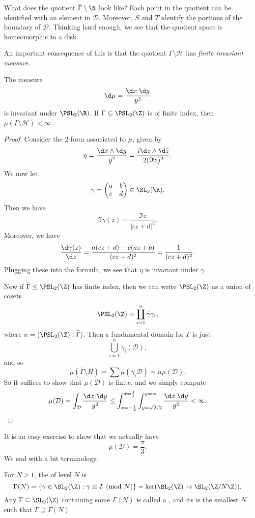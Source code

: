 \documentclass[a4paper]{article}
\renewcommand{\H}{\mathcal{H}}
\begin{document}
What does the quotient $\bar{\Gamma}\setminus \N$ look like? Each point in the quotient can be identified with an element in $\mathcal{D}$. Moreover, $S$ and $T$ identify the portions of the boundary of $\mathcal{D}$. Thinking hard enough, we see that the quotient space is homeomorphic to a disk.

An important consequence of this is that the quotient $\Gamma \setminus \H$ has \emph{finite invariant measure}.
\begin{prop}
  The measure
  \[
    \d \mu = \frac{\d x\;\d y}{y^2}
  \]
  is invariant under $\PSL_2(\R)$. If $\Gamma \subseteq \PSL_2(\Z)$ is of finite index, then $\mu(\Gamma\setminus \H) < \infty$.
\end{prop}

\begin{proof}
  Consider the $2$-form associated to $\mu$, given by
  \[
    \eta = \frac{\d x \wedge \d y}{y^2} = \frac{i \d z \wedge \d \bar{z}}{2 (\Im z)^2}.
  \]
  We now let
  \[
    \gamma =
    \begin{pmatrix}
      a & b\\
      c & d
    \end{pmatrix} \in \SL_2(\R).
  \]
  Then we have
  \[
    \Im \gamma(z) = \frac{\Im z}{|cz + d|^2}.
  \]
  Moreover, we have
  \[
    \frac{\d \gamma(z)}{\d z} = \frac{a(cz + d) - c(az + b)}{(cz + d)^2} = \frac{1}{(cz + d)^2}.
  \]
  Plugging these into the formula, we see that $\eta$ is invariant under $\gamma$.

  Now if $\bar\Gamma \leq \PSL_2(\Z)$ has finite index, then we can write $\PSL_2(\Z)$ as a union of cosets
  \[
    \PSL_2(\Z) = \coprod_{i = 1}^n \bar\gamma \gamma_i,
  \]
  where $n = (\PSL_2(\Z): \bar\Gamma)$. Then a fundamental domain for $\bar\Gamma$ is just
  \[
    \bigcup_{i = 1}^n \gamma_i(\mathcal{D}),
  \]
  and so
  \[
    \mu(\bar\Gamma \setminus H) = \sum \mu(\gamma_i \mathcal{D}) = n \mu(\mathcal{D}).
  \]
  So it suffices to show that $\mu(\mathcal{D})$ is finite, and we simply compute
  \[
    \mu(\mathcal{D}) = \int_\mathcal{D} \frac{\d x\; \d y}{y^2} \leq \int_{x = -\frac{1}{2}}^{x = \frac{1}{2}}\int_{y = \sqrt{2}/2}^{y = \infty} \frac{\d x\;\d y}{y^2} < \infty.
  \]
\end{proof}
It is an easy exercise to show that we actually have
\[
  \mu(\mathcal{D}) = \frac{\pi}{3}.
\]
We end with a bit terminology.
\begin{defi}
  For $N \geq 1$, the  of level $N$ is
  \[
    \Gamma(N) = \{\gamma \in \SL_2(\Z) : \gamma \equiv I \pmod N\} = \ker (\SL_2(\Z) \to \SL_2(\Z/N\Z)).
  \]
  Any $\Gamma \subseteq \SL_2(\Z)$ containing some $\Gamma(N)$ is called a , and its  is the smallest $N$ such that $\Gamma \supseteq \Gamma(N)$
\end{defi}
\end{document}

